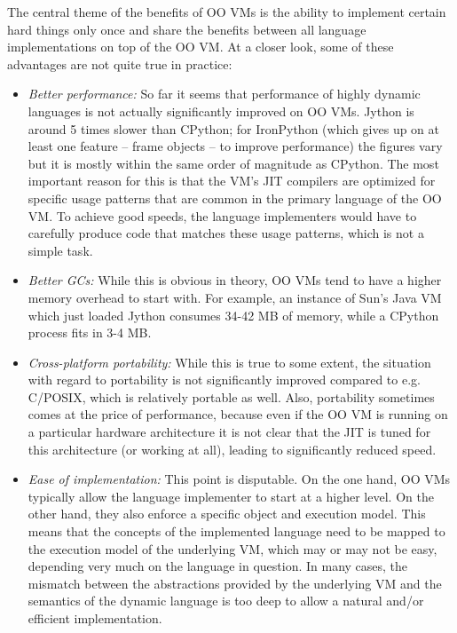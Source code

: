 \documentclass{llncs}
\begin{document}
\noindent
The central theme of the benefits of OO VMs is the ability to
implement certain hard things only once and share the benefits between
all language implementations on top of the OO VM.  At a closer look,
some of these advantages are not quite true in practice:

\begin{itemize}
\item
\emph{Better performance:} So far it seems that performance of highly dynamic
languages is not actually significantly improved on OO VMs. 
Jython is around 5
times slower than CPython; for IronPython (which
gives up on at least one feature -- frame objects -- to improve performance)
the figures vary but it is mostly
within the same order of magnitude as CPython. The most important reason for
this is that the VM's JIT compilers are optimized for specific usage patterns
that are common in the primary language of the OO VM. To achieve good speeds, the
language implementers would have to carefully produce code that matches these
usage patterns, which is not a simple task.

\item
\emph{Better GCs:} While this is obvious in theory, OO VMs tend to have a
higher memory overhead to start with.  For example, an instance of Sun's
Java VM which just loaded Jython consumes 34-42 MB of memory, while a
CPython process fits in 3-4 MB.

\item
\emph{Cross-platform portability:} While this is true to some extent, the
situation with regard to portability is not significantly improved compared to
e.g.  C/POSIX, which is relatively portable as well. Also, portability sometimes
comes at the price of performance, because even if the OO VM is running on a
particular hardware architecture it is not clear that the JIT is tuned for this
architecture (or working at all), leading to significantly reduced
speed.

\item
\emph{Ease of implementation:} This point is disputable. On the one hand, OO
VMs typically allow the language implementer to start at a higher level. On the
other hand, they also enforce a specific object and execution model. This means
that the concepts of the implemented language need to be mapped to the
execution model of the underlying VM, which may or may not be easy, depending very
much on the language in question.  In many cases, the mismatch between
the abstractions provided by the underlying VM and the semantics of the
dynamic language is too deep to allow a natural and/or efficient
implementation.


\end{itemize}
\end{document}
